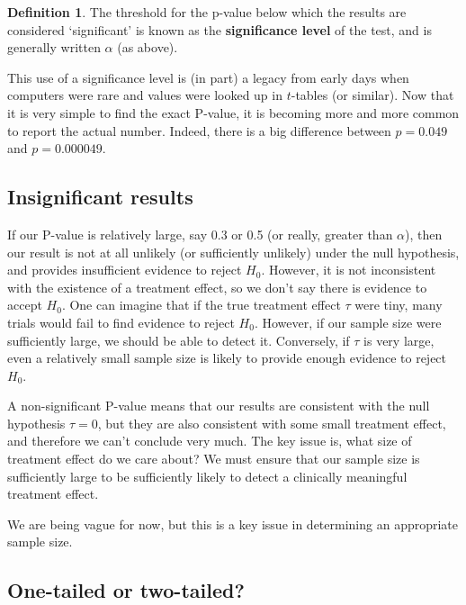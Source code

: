 \documentclass[
  openany]{book}
\theoremstyle{definition}
\newtheorem{definition}{Definition}[chapter]
\theoremstyle{definition}
\theoremstyle{definition}
\theoremstyle{definition}
\theoremstyle{remark}
\begin{document}
\begin{definition}
The threshold for the p-value below which the results are considered `significant' is known as the \textbf{significance level} of the test, and is generally written \(\alpha\) (as above).
\end{definition}

This use of a significance level is (in part) a legacy from early days when computers were rare and values were looked up in \(t\)-tables (or similar). Now that it is very simple to find the exact P-value, it is becoming more and more common to report the actual number. Indeed, there is a big difference between \(p=0.049\) and \(p=0.000049\).

\hypertarget{insignificant-results}{%
\subsection{Insignificant results}\label{insignificant-results}}

If our P-value is relatively large, say 0.3 or 0.5 (or really, greater than \(\alpha\)), then our result is not at all unlikely (or sufficiently unlikely) under the null hypothesis, and provides insufficient evidence to reject \(H_0\). However, it is not inconsistent with the existence of a treatment effect, so we don't say there is evidence to accept \(H_0\). One can imagine that if the true treatment effect \(\tau\) were tiny, many trials would fail to find evidence to reject \(H_0\). However, if our sample size were sufficiently large, we should be able to detect it. Conversely, if \(\tau\) is very large, even a relatively small sample size is likely to provide enough evidence to reject \(H_0\).

A non-significant P-value means that our results are consistent with the null hypothesis \(\tau=0\), but they are also consistent with some small treatment effect, and therefore we can't conclude very much. The key issue is, what size of treatment effect do we care about? We must ensure that our sample size is sufficiently large to be sufficiently likely to detect a clinically meaningful treatment effect.

We are being vague for now, but this is a key issue in determining an appropriate sample size.

\hypertarget{one-tailed-or-two-tailed}{%
\subsection{One-tailed or two-tailed?}\label{one-tailed-or-two-tailed}}
\end{document}

